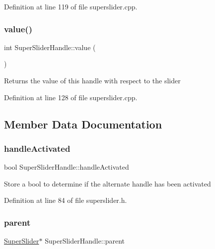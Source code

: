 Definition at line 119 of file superslider.\+cpp.

\mbox{\label{class_super_slider_handle_a45284935c0a9a93f2e611161d3b78c61}} 
\subsubsection{\texorpdfstring{value()}{value()}}
{\footnotesize\ttfamily int Super\+Slider\+Handle\+::value (\begin{DoxyParamCaption}{ }\end{DoxyParamCaption})}

Returns the value of this handle with respect to the slider 

Definition at line 128 of file superslider.\+cpp.



\subsection{Member Data Documentation}
\mbox{\label{class_super_slider_handle_a57621665613ebd303a0b2aa4c5134b38}} 
\subsubsection{\texorpdfstring{handle\+Activated}{handleActivated}}
{\footnotesize\ttfamily bool Super\+Slider\+Handle\+::handle\+Activated}

Store a bool to determine if the alternate handle has been activated 

Definition at line 84 of file superslider.\+h.

\mbox{\label{class_super_slider_handle_ae7159611443ea36306dab546ea939212}} 
\subsubsection{\texorpdfstring{parent}{parent}}
{\footnotesize\ttfamily \hyperlink{class_super_slider}{Super\+Slider}$\ast$ Super\+Slider\+Handle\+::parent}

